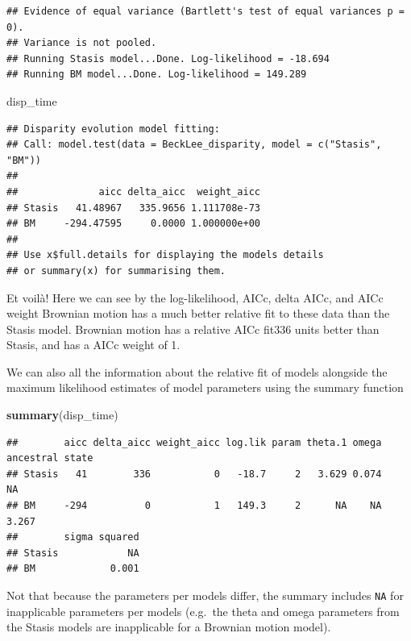 \documentclass[]{book}
\newenvironment{Shaded}{\begin{snugshade}}{\end{snugshade}}
\newcommand{\KeywordTok}[1]{\textcolor[rgb]{0.13,0.29,0.53}{\textbf{#1}}}
\newcommand{\NormalTok}[1]{#1}
\begin{document}
\begin{verbatim}
## Evidence of equal variance (Bartlett's test of equal variances p = 0).
## Variance is not pooled.
## Running Stasis model...Done. Log-likelihood = -18.694
## Running BM model...Done. Log-likelihood = 149.289
\end{verbatim}

\begin{Shaded}
\begin{Highlighting}[]
\NormalTok{disp_time}
\end{Highlighting}
\end{Shaded}

\begin{verbatim}
## Disparity evolution model fitting:
## Call: model.test(data = BeckLee_disparity, model = c("Stasis", "BM")) 
## 
##              aicc delta_aicc  weight_aicc
## Stasis   41.48967   335.9656 1.111708e-73
## BM     -294.47595     0.0000 1.000000e+00
## 
## Use x$full.details for displaying the models details
## or summary(x) for summarising them.
\end{verbatim}

Et voilà! Here we can see by the log-likelihood, AICc, delta AICc, and AICc weight Brownian motion has a much better relative fit to these data than the Stasis model.
Brownian motion has a relative AICc fit336 units better than Stasis, and has a AICc weight of 1.

We can also all the information about the relative fit of models alongside the maximum likelihood estimates of model parameters using the summary function

\begin{Shaded}
\begin{Highlighting}[]
\KeywordTok{summary}\NormalTok{(disp_time)}
\end{Highlighting}
\end{Shaded}

\begin{verbatim}
##        aicc delta_aicc weight_aicc log.lik param theta.1 omega ancestral state
## Stasis   41        336           0   -18.7     2   3.629 0.074              NA
## BM     -294          0           1   149.3     2      NA    NA           3.267
##        sigma squared
## Stasis            NA
## BM             0.001
\end{verbatim}

Not that because the parameters per models differ, the summary includes \texttt{NA} for inapplicable parameters per models (e.g.~the theta and omega parameters from the Stasis models are inapplicable for a Brownian motion model).
\end{document}
